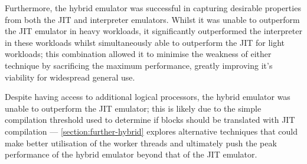 Furthermore, the hybrid emulator was successful in capturing desirable properties from both the JIT and interpreter emulators. Whilst it was unable to outperform the JIT emulator in heavy workloads, it significantly outperformed the interpreter in these workloads whilst simultaneously able to outperform the JIT for light workloads; this combination allowed it to minimise the weakness of either technique by sacrificing the maximum performance, greatly improving it's viability for widespread general use.

Despite having access to additional logical processors, the hybrid emulator was unable to outperform the JIT emulator; this is likely due to the simple compilation threshold used to determine if blocks should be translated with JIT compilation — \autoref{section:further-hybrid} explores alternative techniques that could make better utilisation of the worker threads and ultimately push the peak performance of the hybrid emulator beyond that of the JIT emulator.